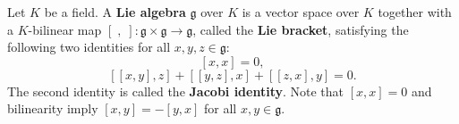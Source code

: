 Let $K$ be a field. A \textbf{Lie algebra} $\mathfrak{g}$ over $K$ is a vector space over $K$ together with a $K$-bilinear map $[\;,\;] : \mathfrak{g} \times \mathfrak{g} \to \mathfrak{g}$, called the \textbf{Lie bracket}, satisfying the following two identities for all $x, y, z \in \mathfrak{g}$:
$$
[x, x] = 0,
$$
$$
[[x, y], z] + [[y, z], x] + [[z, x], y] = 0.
$$
The second identity is called the \textbf{Jacobi identity}. Note that $[x, x] = 0$ and bilinearity imply $[x, y] = -[y, x]$ for all $x, y \in \mathfrak{g}$.
